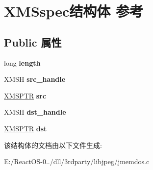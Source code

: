 \hypertarget{struct_x_m_sspec}{}\section{X\+M\+Sspec结构体 参考}
\label{struct_x_m_sspec}
\subsection*{Public 属性}
\begin{DoxyCompactItemize}
\item 
\mbox{\label{struct_x_m_sspec_ab8f35573bf6f49ddabd5ca36c8231393}} 
long {\bfseries length}
\item 
\mbox{\label{struct_x_m_sspec_a20d6b59c699cfa09599d5a0047fdb856}} 
X\+M\+SH {\bfseries src\+\_\+handle}
\item 
\mbox{\label{struct_x_m_sspec_a4b5265e0963f282e1d38833a32c48514}} 
\hyperlink{union_x_m_s_p_t_r}{X\+M\+S\+P\+TR} {\bfseries src}
\item 
\mbox{\label{struct_x_m_sspec_a6af469e471e4480962aa2b2614b4f341}} 
X\+M\+SH {\bfseries dst\+\_\+handle}
\item 
\mbox{\label{struct_x_m_sspec_a9fd069160fa64dfb5d36ec11b3694dee}} 
\hyperlink{union_x_m_s_p_t_r}{X\+M\+S\+P\+TR} {\bfseries dst}
\end{DoxyCompactItemize}


该结构体的文档由以下文件生成\+:\begin{DoxyCompactItemize}
\item 
E\+:/\+React\+O\+S-\/0../dll/3rdparty/libjpeg/jmemdos.\+c\end{DoxyCompactItemize}
